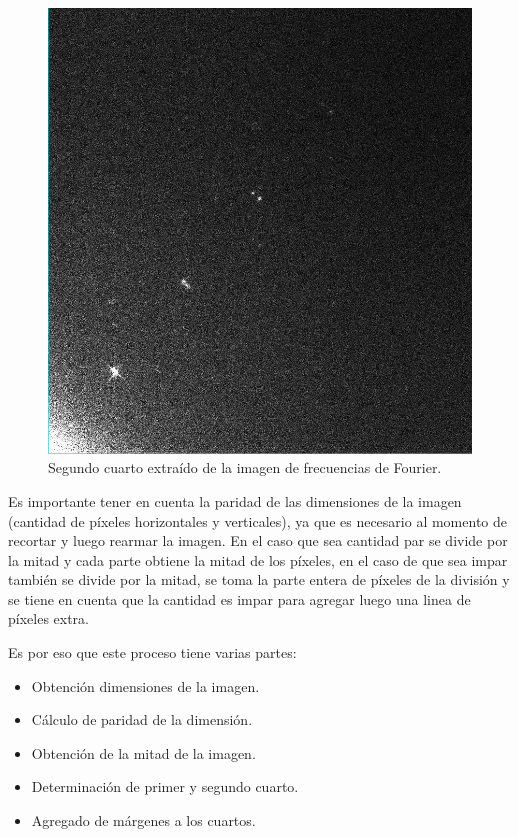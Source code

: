 \documentclass[10pt,a4paper, twoside]{report}
\begin{document}
\begin{figure}[!htb]
\begin {minipage}{0.48\textwidth}
			\includegraphics[width=1.0\linewidth]{imagenes/sndQuarterFourier.jpg}
			\caption{Segundo cuarto extraído de la imagen de frecuencias de Fourier.}
			\label{secondQuarter}
   \end{minipage}
\end{figure}

Es importante tener en cuenta la paridad de las dimensiones de la imagen (cantidad de píxeles horizontales y verticales), ya que es necesario al momento de recortar y luego rearmar la imagen. En el caso que sea cantidad par se divide por la mitad y cada parte obtiene la mitad de los píxeles, en el caso de que sea impar también se divide por la mitad, se toma la parte entera de píxeles de la división y se tiene en cuenta que la cantidad es impar para agregar luego una linea de píxeles extra.

Es por eso que este proceso tiene varias partes:

\begin{itemize}
	\item Obtención dimensiones de la imagen.
	\item Cálculo de paridad de la dimensión.
	\item Obtención de la mitad de la imagen.
	\item Determinación de primer y segundo cuarto.
	\item Agregado de márgenes a los cuartos.
\end{itemize}
\end{document}
